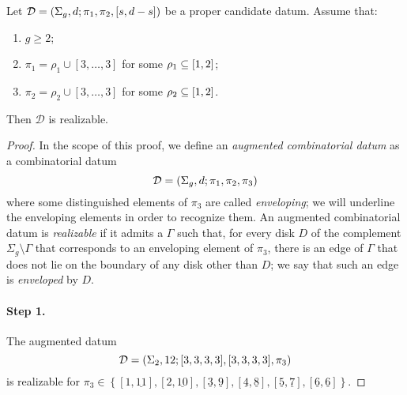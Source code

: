 \documentclass{article}
\begin{document}
\begin{lemma}\label{th:exceptional-n3-special-family}
Let $\mathcal{D}=\left(\Sigma_g,d;\pi_1,\pi_2,[s,d-s]\right)$ be a proper candidate datum. Assume that:
\begin{enumerate}
\item $g\ge 2$;
\item $\pi_1=\rho_1\cup[3,\ldots,3]$ for some $\rho_1\subseteq[1,2]$;
\item $\pi_2=\rho_2\cup[3,\ldots,3]$ for some $\rho_2\subseteq[1,2]$.
\end{enumerate}
Then $\mathcal{D}$ is realizable.
\end{lemma}
\begin{proof}
\newcommand{\env}[1]{\underline{#1}}
In the scope of this proof, we define an \emph{augmented combinatorial datum} as a combinatorial datum
\[
\mathcal{D}=\left(\Sigma_g,d;\pi_1,\pi_2,\pi_3\right)
\]
where some distinguished elements of $\pi_3$ are called \emph{enveloping}; we will underline the enveloping elements in order to recognize them. An augmented combinatorial datum is \emph{realizable} if it admits a \dessin{} $\Gamma$ such that, for every disk $D$ of the complement $\Sigma_g\setminus\Gamma$ that corresponds to an enveloping element of $\pi_3$, there is an edge of $\Gamma$ that does not lie on the boundary of any disk other than $D$; we say that such an edge is \emph{enveloped} by $D$.

\paragraph{Step 1.} The augmented datum
\[
\mathcal{D}=\left(\Sigma_2,12;[3,3,3,3],[3,3,3,3],\pi_3\right)
\]
is realizable for $\pi_3\in\left\{[1,\env{11}],[2,\env{10}],[\env{3},\env{9}],[\env{4},\env{8}],[\env{5},\env{7}],[\env{6},\env{6}]\right\}$.
\end{proof}
\end{document}
